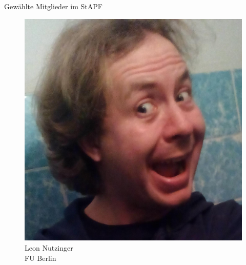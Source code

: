 \documentclass[compress, aspectratio=169]{beamer}
\begin{document}
\begin{frame}{Gewählte Mitglieder im StAPF}
\begin{minipage}{.28\textwidth}
\begin{figure}
\begin{minipage}[r]{.57\textwidth}
        \includegraphics[height=0.3\textheight]{leon.jpg}
      \end{minipage} \hfill
      \begin{minipage}[c]{.4\textwidth}
        \caption*{Leon Nutzinger \\FU Berlin}
      \end{minipage}
    \end{figure}
  \end{minipage}


\end{frame}
\end{document}
